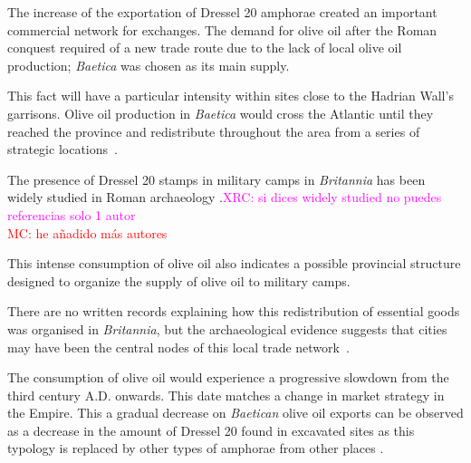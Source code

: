 \documentclass[review]{elsarticle}
\newcommand{\memo}[2]{\textcolor{#1}{#2}}
\newcommand{\maria}[1]{\memo{red}{MC: #1\\}}
\newcommand{\xavi}[1]{\memo{magenta}{XRC: #1\\}}
\begin{document}
The increase of the exportation of Dressel 20 amphorae created an important commercial network for exchanges. The demand for olive oil after the Roman conquest required of a new trade route due to the lack of local olive oil production; \textit{Baetica} was chosen as its main supply.


This fact will have a particular intensity within sites close to the Hadrian Wall's garrisons. Olive oil production in \textit{Baetica} would cross the Atlantic until they reached the province and redistribute throughout the area from a series of strategic locations~\citep{carreras_atlantic_2012}. 


The presence of Dressel 20 stamps in military camps in \textit{Britannia} has been widely studied in Roman archaeology \citep{williams_importation_1983,
funari_corpus_1996,
carreras_britannia_1998,carreras_abastecimiento_2003}.\xavi{si dices widely studied no puedes referencias solo 1 autor}
\maria{he añadido más autores}


This intense consumption of olive oil also indicates a possible provincial structure designed to organize the supply of olive oil to military camps. 


There are no written records explaining how this redistribution of essential goods was organised in \textit{Britannia}, but the archaeological evidence suggests that cities may have been the central nodes of this local trade network~\citep[45]{funari_economic_2005}.

The consumption of olive oil would experience a progressive slowdown from the third century A.D. onwards. This date matches a change in market strategy in the Empire. This a gradual decrease on \textit{Baetican} olive oil exports can be observed as a decrease in the amount of Dressel 20 found in excavated sites as this typology is replaced by other types of amphorae from other places \citep{rodriguez1991aceite,millet_anforas_1998}.
\end{document}
